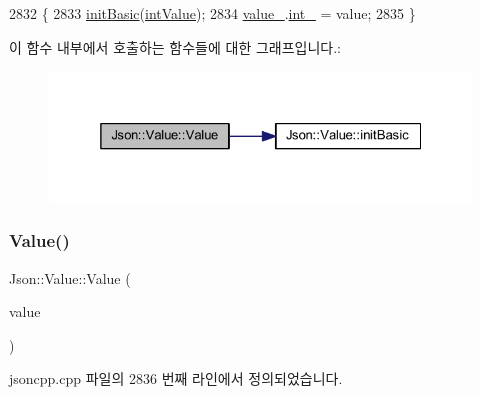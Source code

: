 \begin{DoxyCode}
2832                         \{
2833   \hyperlink{class_json_1_1_value_a32b86b71564157f40f880f5736be822a}{initBasic}(\hyperlink{namespace_json_a7d654b75c16a57007925868e38212b4eae5a9d708d5c9e23ae9bf98898522512d}{intValue});
2834   \hyperlink{class_json_1_1_value_aef578244546212705b9f81eb84d7e151}{value\_}.\hyperlink{union_json_1_1_value_1_1_value_holder_adbfb384301298844ed955ba5cf6015a0}{int\_} = value;
2835 \}
\end{DoxyCode}
이 함수 내부에서 호출하는 함수들에 대한 그래프입니다.\+:\nopagebreak
\begin{figure}[H]
\begin{center}
\leavevmode
\includegraphics[width=325pt]{class_json_1_1_value_ab1cdc3d9a4d4cc03fa01439d43ceb1b5_cgraph}
\end{center}
\end{figure}
\mbox{\label{class_json_1_1_value_a8adda58d5ae17bf7ca6a53bab4a7b69c}} 
\subsubsection{\texorpdfstring{Value()}{Value()}\hspace{0.1cm}{\footnotesize\ttfamily [5/12]}}
{\footnotesize\ttfamily Json\+::\+Value\+::\+Value (\begin{DoxyParamCaption}\item[{\hyperlink{class_json_1_1_value_a8b62564be8c087c6d18de180ff4e13e3}{U\+Int64}}]{value }\end{DoxyParamCaption})}



jsoncpp.\+cpp 파일의 2836 번째 라인에서 정의되었습니다.


